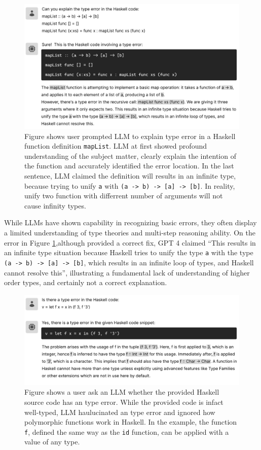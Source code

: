 \begin{figure}[hbt]
  \includegraphics[width=\linewidth]{LLM}
  \caption{\label{fig:llm}
  Figure shows user prompted LLM to explain type error in a Haskell function definition \texttt{mapList}. LLM at first showed profound understanding of the subject matter, clearly explain the intention of the function and accurately identified the error location. In the last sentence, LLM claimed the definition will results in an infinite type, because trying to unify \texttt{a} with \texttt{(a -> b) -> [a] -> [b]}. In reality, unify two function with differrent number of arguments will not cause infinity types. 
    }
\end{figure}

While LLMs have shown capability in recognizing basic errors, they often display a limited understanding of type theories and multi-step reasoning ability. On the error in Figure \ref{fig:llm},although provided a correct fix, GPT 4 claimed “This results in an infinite type situation because Haskell tries to unify the type \texttt{a} with the type \texttt{(a -> b) -> [a] -> [b]}, which results in an infinite loop of types, and Haskell cannot resolve this”, illustrating a fundamental lack of understanding of higher order types, and certainly not a correct explanation.

\begin{figure}[hbt]
  \includegraphics[width=\linewidth]{LLM2}
  \caption{\label{fig:llm2}
  Figure shows a user ask an LLM whether the provided Haskell source code has an type error. While the provided code is infact well-typed, LLM haulucinated an type error and ignored how polymorphic functions work in Haskell. In the example, the function \texttt{f},  defined the same way as the \texttt{id} function, can be applied with a value of any type.
    } 
\end{figure}

